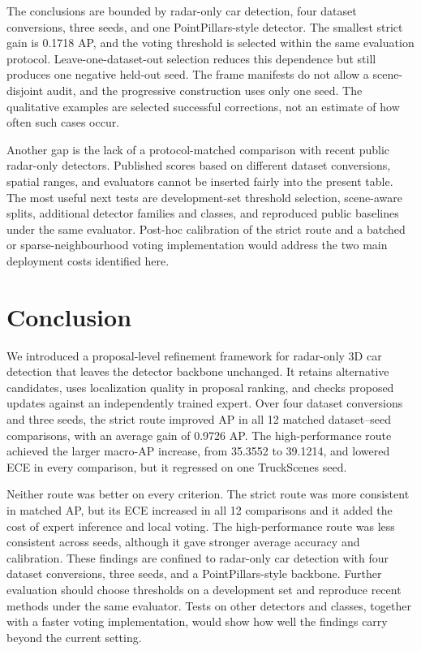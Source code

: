 \documentclass[sensors,article,submit,pdftex,moreauthors]{Definitions/mdpi}
\begin{document}
The conclusions are bounded by radar-only car detection, four dataset
conversions, three seeds, and one PointPillars-style detector. The smallest
strict gain is 0.1718 AP, and the voting threshold is selected within the same
evaluation protocol. Leave-one-dataset-out selection reduces this dependence
but still produces one negative held-out seed. The frame manifests do not allow
a scene-disjoint audit, and the progressive construction uses only one seed.
The qualitative examples are selected successful corrections, not an estimate
of how often such cases occur.

Another gap is the lack of a protocol-matched comparison with recent public
radar-only detectors. Published scores based on different dataset conversions,
spatial ranges, and evaluators cannot be inserted fairly into the present table.
The most useful next tests are development-set threshold selection, scene-aware
splits, additional detector families and classes, and reproduced public
baselines under the same evaluator. Post-hoc calibration of the strict route
and a batched or sparse-neighbourhood voting implementation would address the
two main deployment costs identified here.

\section{Conclusion}

We introduced a proposal-level refinement framework for radar-only 3D car
detection that leaves the detector backbone unchanged. It retains alternative
candidates, uses localization quality in proposal ranking, and checks proposed
updates against an independently trained expert. Over four dataset conversions
and three seeds, the strict route improved AP in all 12 matched dataset--seed
comparisons, with an average gain of 0.9726 AP. The high-performance route achieved
the larger macro-AP increase, from 35.3552 to 39.1214, and lowered ECE in every
comparison, but it regressed on one TruckScenes seed.

Neither route was better on every criterion. The strict route was more
consistent in matched AP, but its ECE increased in all 12 comparisons and it
added the cost of expert inference and local voting. The high-performance route
was less consistent across seeds, although it gave stronger average accuracy
and calibration. These findings are confined to radar-only car detection with
four dataset conversions, three seeds, and a PointPillars-style backbone.
Further evaluation should choose thresholds on a development set and reproduce
recent methods under the same evaluator. Tests on other detectors and classes,
together with a faster voting implementation, would show how well the findings
carry beyond the current setting.
\end{document}
